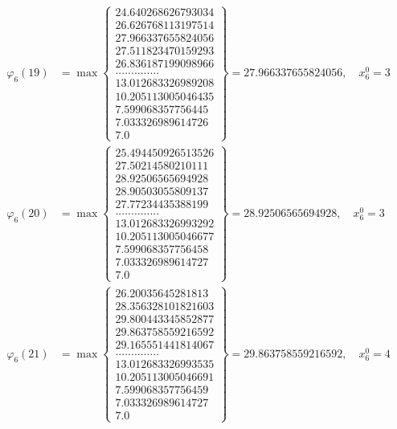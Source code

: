 \documentclass{article}
\begin{document}
\begin{align*}
  
  
  
\varphi_{6}(19) &= \max \left\{ \begin{array}{c}
24.640268626793034 \\
 26.626768113197514 \\
 27.966337655824056 \\
 27.511823470159293 \\
 26.836187199098966 \\
 .............. \\
 13.012683326989208 \\
 10.205113005046435 \\
 7.599068357756445 \\
 7.033326989614726 \\
 7.0
\end{array} \right\} = 27.966337655824056, \quad x_{6}^0 = 3\\
  
  
  
  
\varphi_{6}(20) &= \max \left\{ \begin{array}{c}
25.494450926513526 \\
 27.50214580210111 \\
 28.92506565694928 \\
 28.90503055809137 \\
 27.77234435388199 \\
 .............. \\
 13.012683326993292 \\
 10.205113005046677 \\
 7.599068357756458 \\
 7.033326989614727 \\
 7.0
\end{array} \right\} = 28.92506565694928, \quad x_{6}^0 = 3\\
  
  
  
  
\varphi_{6}(21) &= \max \left\{ \begin{array}{c}
26.20035645281813 \\
 28.356328101821603 \\
 29.800443345852877 \\
 29.863758559216592 \\
 29.165551441814067 \\
 .............. \\
 13.012683326993535 \\
 10.205113005046691 \\
 7.599068357756459 \\
 7.033326989614727 \\
 7.0
\end{array} \right\} = 29.863758559216592, \quad x_{6}^0 = 4\\
  

\end{align*}
\end{document}
